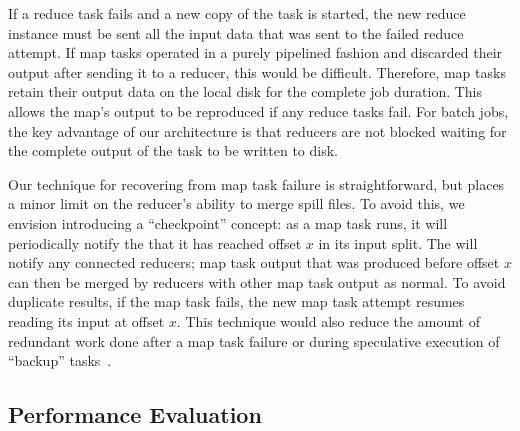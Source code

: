 If a reduce task fails and a new copy of the task is started, the new
reduce instance must be sent all the input data that was sent to the
failed reduce attempt. If map tasks operated in a purely pipelined
fashion and discarded their output after sending it to a reducer, this
would be difficult. Therefore, map tasks retain their output data on
the local disk for the complete job duration. This allows the map's output to be 
reproduced if any reduce tasks fail. For batch jobs, the key advantage of our architecture is
that reducers are not blocked waiting for the complete output of the
task to be written to disk.

Our technique for recovering from map task failure is straightforward, but
places a minor limit on the reducer's ability to merge spill files. To avoid
this, we envision introducing a ``checkpoint'' concept: as a map task runs, it
will periodically notify the {\JT} that it has reached offset $x$ in its input
split. The {\JT} will notify any connected reducers; map task output that was
produced before offset $x$ can then be merged by reducers with other map task
output as normal. To avoid duplicate results, if the map task fails, the new map
task attempt resumes reading its input at offset $x$. This technique would also
reduce the amount of redundant work done after a map task failure or during
speculative execution of ``backup'' tasks~\cite{mapreduce-osdi}.

\subsection{Performance Evaluation}
\label{ch:hop:sec:perf}

